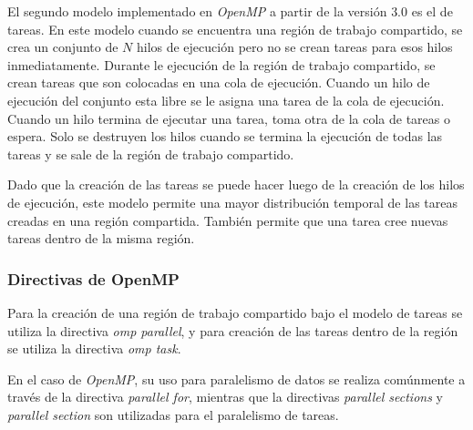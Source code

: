 El segundo modelo implementado en \emph{OpenMP} a partir de la versión $3.0$ es
el de tareas. En este modelo cuando se encuentra una región de trabajo
compartido, se crea un conjunto de $N$ hilos de ejecución pero no se crean
tareas para esos hilos inmediatamente. Durante le ejecución de la región de
trabajo compartido, se crean tareas que son colocadas en una cola de ejecución.
Cuando un hilo de ejecución del conjunto esta libre se le asigna una tarea de la
cola de ejecución. Cuando un hilo termina de ejecutar una tarea, toma otra de la
cola de tareas o espera. Solo se destruyen los hilos cuando se termina la
ejecución de todas las tareas y se sale de la región de trabajo compartido.

Dado que la creación de las tareas se puede hacer luego de la creación de los
hilos de ejecución, este modelo permite una mayor distribución temporal de las
tareas creadas en una región compartida. También permite que una tarea cree
nuevas tareas dentro de la misma región.

\subsubsection{Directivas de OpenMP}

Para la creación de una región de trabajo compartido bajo el modelo de tareas se
utiliza la directiva \emph{omp parallel}, y para creación de las tareas dentro
de la región se utiliza la directiva \emph{omp task}.

En el caso de \emph{OpenMP}, su uso para paralelismo de datos se realiza
comúnmente a través de la directiva \emph{parallel for}, mientras que la
directivas \emph{parallel sections} y \emph{parallel section} son utilizadas
para el paralelismo de tareas.
